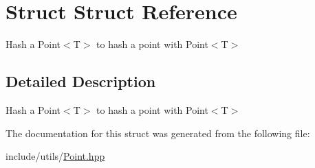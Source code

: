 \hypertarget{structStruct}{}\section{Struct Struct Reference}
\label{structStruct}


Hash a Point$<$\+T$>$ to hash a point with Point$<$\+T$>$  




\subsection{Detailed Description}
Hash a Point$<$\+T$>$ to hash a point with Point$<$\+T$>$ 

The documentation for this struct was generated from the following file\+:\begin{DoxyCompactItemize}
\item 
include/utils/\hyperlink{Point_8hpp}{Point.\+hpp}\end{DoxyCompactItemize}

